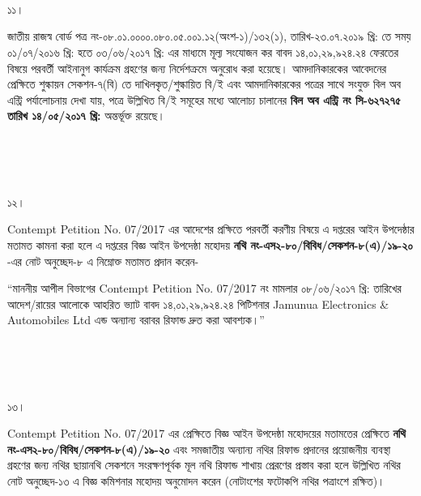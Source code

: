 \documentclass[12pt]{article}
\begin{document}
\\
\\
\\
\begin{minipage}[t]{0.05\linewidth}
১১।
\end{minipage}
\begin{minipage}[t]{1\linewidth}
জাতীয় রাজস্ব বোর্ড পত্র
নং-০৮.০১.০০০০.০৮০.০৫.০০১.১২(অংশ-১)/১৩২(১),
তারিখ-২৩.০৭.২০১৯ খ্রি:
তে সময়
০১/০৭/২০১৬ খ্রি: হতে ০৩/০৬/২০১৭ খ্রি:
এর মাধ্যমে মূল্য সংযোজন কর বাবদ
১৪,০১,২৯,৯২৪.২৪
ফেরতের বিষয়ে পরবর্তী
আইনানুগ কার্যক্রম গ্রহণের জন্য
নির্দেশক্রমে অনুরোধ করা হয়েছে।
আমদানিকারকের আবেদনের প্রেক্ষিতে শুল্কায়ন
সেকশন-৭(বি) তে দাখিলকৃত/শুল্কায়িত
বি/ই এবং আমদানিকারকের
পত্রের সাথে সংযুক্ত বিল অব এন্ট্রি
পর্যালোচনায় দেখা যায়,
পত্রে উল্লিখিত বি/ই সমূহের
মধ্যে আলোচ্য চালানের
\textbf{বিল অব এন্ট্রি নং সি-৬২৭২৭৫ তারিখ ১৪/০৫/২০১৭ খ্রি:}
অন্তর্ভূক্ত রয়েছে।
\end{minipage}
\\
\\
\\
\begin{minipage}[t]{0.05\linewidth}
১২।
\end{minipage}
\begin{minipage}[t]{1\linewidth}
Contempt Petition No. 07/2017
এর আদেশের প্রক্ষিতে পরবর্তী
করণীয় বিষয়ে এ দপ্তরের আইন
উপদেষ্ঠার মতামত কামনা করা হলে এ দপ্তরের
বিজ্ঞ আইন উপদেষ্ঠা মহোদয়
\textbf{নথি নং-এস২-৮০/বিবিধ/সেকশন-৮(এ)/১৯-২০}
-এর নোট অনুচ্ছেদ-৮ এ নিম্নোক্ত মতামত প্রদান করেন-


\hspace{1em}``মাননীয় আপীল বিভাগের
Contempt Petition No. 07/2017
নং মামলার ০৮/০৬/২০১৭ খ্রি: তারিখের
আদেশ/রায়ের আলোকে আহরিত ভ্যাট বাবদ
১৪,০১,২৯,৯২৪.২৪
পিটিশনার
Jamunua Electronics \& Automobiles Ltd
এন্ড অন্যান্য বরাবর রিফান্ড
দ্রুত করা আবশ্যক।''
\end{minipage}
\\
\\
\\
\begin{minipage}[t]{0.05\linewidth}
১৩।
\end{minipage}
\begin{minipage}[t]{1\linewidth}
Contempt Petition No. 07/2017
এর প্রেক্ষিতে বিজ্ঞ আইন উপদেষ্ঠা মহোদয়ের
মতামতের প্রেক্ষিতে
\textbf{নথি নং-এস২-৮০/বিবিধ/সেকশন-৮(এ)/১৯-২০}
এবং সমজাতীয় অন্যান্য নথির
রিফান্ড প্রদানের প্রয়োজনীয় ব্যবস্থা গ্রহণের
জন্য নথির ছায়ানথি সেকশনে
সংরক্ষণপূর্বক মূল নথি রিফান্ড
শাখায় প্রেরণের প্রস্তাব করা হলে উল্লিখিত নথির
নোট অনুচ্ছেদ-১৩ এ বিজ্ঞ কমিশনার মহোদয় অনুমোদন
করেন (নোটাংশের ফটোকপি নথির পত্রাংশে রক্ষিত)।
\end{minipage}
\end{document}

